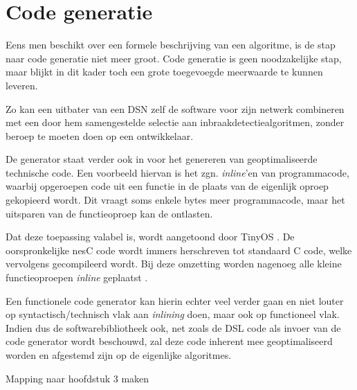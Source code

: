 \section{Code generatie}
\label{section:solution-codegen}

Eens men beschikt over een formele beschrijving van een algoritme, is de stap
naar code generatie niet meer groot. Code generatie is geen noodzakelijke stap,
maar blijkt in dit kader toch een grote toegevoegde meerwaarde te kunnen
leveren.

Zo kan een uitbater van een DSN zelf de software voor zijn netwerk combineren
met een door hem samengestelde selectie aan inbraakdetectiealgoritmen, zonder
beroep te moeten doen op een ontwikkelaar.

De generator staat verder ook in voor het genereren van geoptimaliseerde
technische code. Een voorbeeld hiervan is het zgn. \emph{inline}'en van
programmacode, waarbij opgeroepen code uit een functie in de plaats van de
eigenlijk oproep gekopieerd wordt. Dit vraagt soms enkele bytes meer
programmacode, maar het uitsparen van de functieoproep kan de \mcu ontlasten.

Dat deze toepassing valabel is, wordt aangetoond door TinyOS
\citep{levis2005tinyos}. De oorspronkelijke nesC code wordt immers herschreven
tot standaard C code, welke vervolgens gecompileerd wordt. Bij deze omzetting
worden nagenoeg alle kleine functieoproepen \emph{inline} geplaatst
\citep{gay2007software}.

Een functionele code generator kan hierin echter veel verder gaan en niet
louter op syntactisch/technisch vlak aan \emph{inlining} doen, maar ook op
functioneel vlak. Indien dus de softwarebibliotheek ook, net zoals de DSL code
als invoer van de code generator wordt beschouwd, zal deze code inherent mee
geoptimaliseerd worden en afgestemd zijn op de eigenlijke algoritmes.

\TODO

Mapping naar hoofdstuk 3 maken
